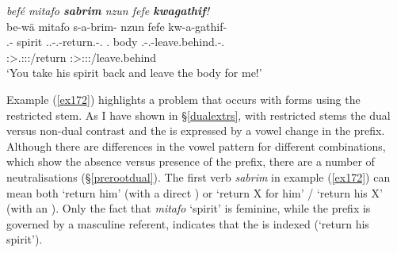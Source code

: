 \begin{exe}
	\ex \emph{befé mitafo \textbf{sabrim} nzun fefe \textbf{kwagathif}!}\\
	\glll be-wä mitafo s-a-brim-\Zero{} nzun fefe kw-a-gathif-\Zero{}\\
	\Ssg.\Erg-\Emph{} spirit \Tsg.\Masc.\Bet{}-\Vc.\Ndu-return.\Rs-\Ssg.\Imp{} \Fsg.\Dat{} body \Fsg.\Bet-\Vc.\Ndu-leave.behind.\Rs-\Ssg.\Imp{}\\
	{} {} \footnotesize{\Ssg:\Sbj>\Tsg.\Masc:\Io:\Imp:\Pfv/return} {} {} \footnotesize{\Ssg:\Sbj>\Fsg:\Io:\Imp:\Pfv/leave.behind}\\
	\trans `You take his spirit back and leave the body for me!'
	\label{ex172}
\end{exe}

Example (\ref{ex172}) highlights a problem that occurs with  forms using the restricted stem. As I have shown in \S{}\ref{dualextrs}, with restricted stems the dual versus non-dual contrast and the  is expressed by a vowel change in the prefix. Although there are differences in the vowel pattern for different  combinations, which show the absence versus presence of the  prefix, there are a number of neutralisations (\S{}\ref{prerootdual}). The first verb \emph{sabrim} in example (\ref{ex172}) can mean both `return him' (with a direct ) or `return X for him' / `return his X' (with an ). Only the fact that \emph{mitafo} `spirit' is feminine, while the prefix is governed by a masculine referent, indicates that the  is indexed (`return his spirit').%

